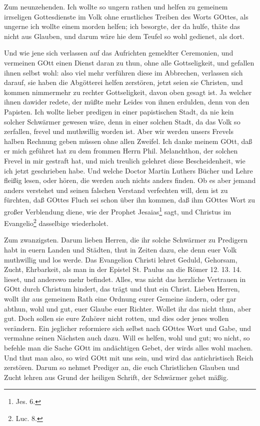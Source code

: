 Zum neunzehenden. Ich wollte so ungern rathen und helfen zu gemeinem irrseligen Gottesdienste im Volk ohne ernstliches Treiben des Worts GOttes, als ungerne ich wollte einem morden helfen; ich besorgte, der da hulfe, thäte das nicht aus Glauben, und darum wäre hie dem Teufel so wohl gedienet, als dort.

Und wie jene sich verlassen auf das Aufrichten gemeldter Ceremonien, und vermeinen GOtt einen Dienst daran zu thun, ohne alle Gottseligkeit, und gefallen ihnen selbst wohl: also viel mehr verführen diese im Abbrechen, verlassen sich darauf, sie haben die Abgötterei helfen zerstören, jetzt seien sie Christen, und kommen nimmermehr zu rechter Gottseligkeit, davon oben gesagt ist. Ja welcher ihnen dawider redete, der müßte mehr Leides von ihnen erdulden, denn von den Papisten. Ich wollte lieber predigen in einer papistischen Stadt, da nie kein solcher Schwärmer gewesen wäre, denn in einer solchen Stadt, da das Volk so zerfallen, frevel und muthwillig worden ist. Aber wir werden unsers Frevels halben Rechnung geben müssen ohne allen Zweifel. Ich danke meinem GOtt, daß er mich geführet hat zu dem frommen Herrn Phil. Melanchthon, der solchen Frevel in mir gestraft hat, und mich treulich gelehret diese Bescheidenheit, wie ich jetzt geschrieben habe. Und welche Doctor Martin Luthers Bücher und Lehre fleißig lesen, oder hören, die werden auch nichts anders finden. Ob es aber jemand anders verstehet und seinen falschen Verstand verfechten will, dem ist zu fürchten, daß GOttes Fluch sei schon über ihn kommen, daß ihm GOttes Wort zu großer Verblendung diene, wie der Prophet Jesaias\footnote{Jes. 6.} sagt, und Christus im Evangelio\footnote{Luc. 8.} dasselbige wiederholet.

Zum zwanzigsten. Darum lieben Herren, die ihr solche Schwärmer zu Predigern habt in euern Landen und Städten, thut in Zeiten dazu, ehe denn euer Volk muthwillig und los werde. Das Evangelion Christi lehret Geduld, Gehorsam, Zucht, Ehrbarkeit, als man in der Epistel St. Paulus an die Römer 12. 13. 14. lieset, und anderswo mehr
befindet. Alles, was nicht das herzliche Vertrauen in GOtt durch Christum hindert, das trägt und thut ein Christ. Lieben Herren, wollt ihr aus gemeinem Rath eine Ordnung eurer Gemeine ändern, oder gar abthun, wohl und gut, euer Glaube euer Richter. Wollet ihr das nicht thun, aber gut. Doch sollen sie eure Zuhörer nicht rotten, und dies oder jenes wollen verändern. Ein jeglicher reformiere sich selbst nach GOttes Wort und Gabe, und vermahne seinen Nächsten auch dazu. Will es helfen, wohl und gut; wo nicht, so befehle man die Sache GOtt im andächtigen Gebet, der wirds alles wohl machen. Und thut man also, so wird GOtt mit uns sein, und wird das antichristisch Reich zerstören. Darum so nehmet Prediger an, die euch Christlichen Glauben und Zucht lehren aus Grund der heiligen Schrift, der Schwärmer gehet mäßig.

